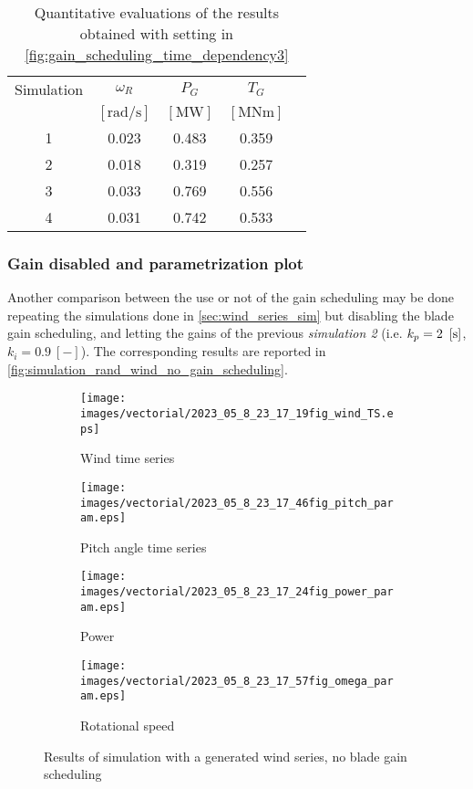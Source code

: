 \begin{table}[htb]
  \caption{Quantitative evaluations of the results obtained with setting in \autoref{fig:gain_scheduling_time_dependency3}}
  \centering
  \begin{tabular}{ccccc}
  \toprule
    Simulation & $\omega_R$  & $P_G$ & $T_G$ \\ 
     & $\left[\si{\radian\per\second}\right]$ & $\left[\si{\mega\watt}\right]$ &$\left[\si{\mega\newton\meter}\right]$ \\ \midrule       
     1 & 0.023 & 0.483 & 0.359 \\
     2 & 0.018 & 0.319 & 0.257 \\
     3 & 0.033 & 0.769 & 0.556 \\
     4 & 0.031 & 0.742 & 0.533 \\
     \bottomrule
  \end{tabular}
  \label{tab:res_variable_gains3}
\end{table}

\subsubsection{Gain disabled and parametrization plot}

Another comparison between the use or not of the gain scheduling may be done repeating the simulations done in \autoref{sec:wind_series_sim} but disabling the blade gain scheduling, and letting the gains of the previous \textit{simulation 2} (i.e. $k_p = 2 \ \left[\si{\second}\right]$, $k_i=0.9 \ [-]$). The corresponding results are reported in \autoref{fig:simulation_rand_wind_no_gain_scheduling}.
\begin{figure}[htb]
  \begin{subfigure}{0.5\columnwidth}
    \centering
    \texttt{[image: images/vectorial/2023\_05\_8\_23\_17\_19fig\_wind\_TS.eps]}
    \caption{Wind time series}
    \label{fig:2023_05_8_22_43_35fig_wind_TS.eps}
  \end{subfigure}
  \begin{subfigure}{0.5\columnwidth}
    \centering
    \texttt{[image: images/vectorial/2023\_05\_8\_23\_17\_46fig\_pitch\_param.eps]}
    \caption{Pitch angle time series}
    \label{fig:2023_05_8_22_44_05fig_pitch_param}
  \end{subfigure}
  \begin{subfigure}{0.5\columnwidth}
    \centering
    \texttt{[image: images/vectorial/2023\_05\_8\_23\_17\_24fig\_power\_param.eps]}
    \caption{Power}
    \label{fig:2023_05_8_22_44_15fig_power_param}
  \end{subfigure}
  \begin{subfigure}{0.5\columnwidth}
    \centering
    \texttt{[image: images/vectorial/2023\_05\_8\_23\_17\_57fig\_omega\_param.eps]}
    \caption{Rotational speed}
    \label{fig:2023_05_8_23_17_57fig_omega_param}
  \end{subfigure}
  \caption{Results of simulation with a generated wind series, no blade gain scheduling}
  \label{fig:simulation_rand_wind_no_gain_scheduling}
\end{figure}

